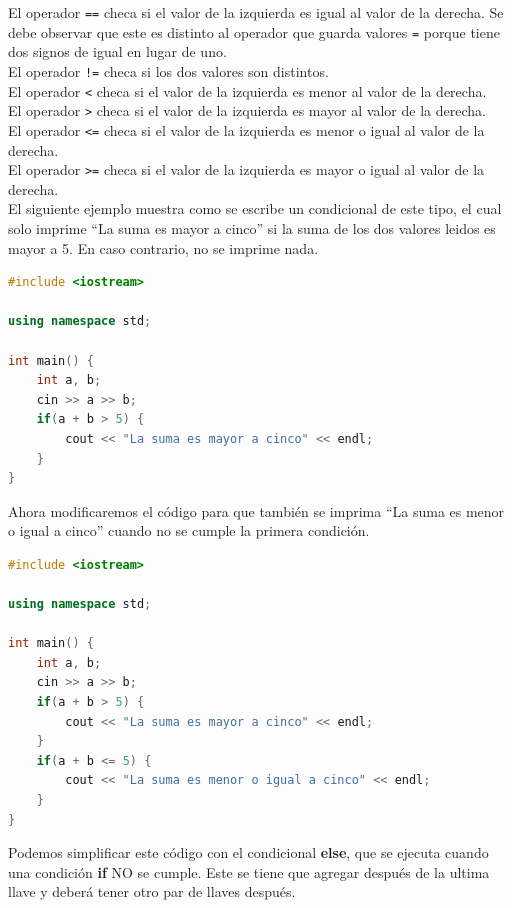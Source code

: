 \documentclass{article}
\begin{document}
El operador \lstinline{==} checa si el valor de la izquierda es igual al valor de la derecha. Se debe observar que este es distinto al operador que guarda valores \lstinline{=} porque tiene dos signos de igual en lugar de uno. \\

El operador \lstinline{!=} checa si los dos valores son distintos. \\

El operador \lstinline{<} checa si el valor de la izquierda es menor al valor de la derecha. \\

El operador \lstinline{>} checa si el valor de la izquierda es mayor al valor de la derecha. \\

El operador \lstinline{<=} checa si el valor de la izquierda es menor o igual al valor de la  derecha. \\

El operador \lstinline{>=} checa si el valor de la izquierda es mayor o igual al valor de la derecha. \\

El siguiente ejemplo muestra como se escribe un condicional de este tipo, el cual solo imprime ``La suma es mayor a cinco'' si la suma de los dos valores leidos es mayor a 5. En caso contrario, no se imprime nada.

\begin{lstlisting}[language=C++, title=Condiciones]
#include <iostream>

using namespace std;

int main() {
	int a, b;
	cin >> a >> b;
	if(a + b > 5) {
		cout << "La suma es mayor a cinco" << endl;
	}
}
\end{lstlisting}

Ahora modificaremos el código para que también se imprima ``La suma es menor o igual a cinco'' cuando no se cumple la primera condición.

\begin{lstlisting}[language=C++, title=Condiciones]
#include <iostream>

using namespace std;

int main() {
	int a, b;
	cin >> a >> b;
	if(a + b > 5) {
		cout << "La suma es mayor a cinco" << endl;
	}
	if(a + b <= 5) {
		cout << "La suma es menor o igual a cinco" << endl;
	}
}
\end{lstlisting}

Podemos simplificar este código con el condicional \textbf{else}, que se ejecuta cuando una condición \textbf{if} NO se cumple. Este se tiene que agregar después de la ultima llave y deberá tener otro par de llaves después.
\end{document}
